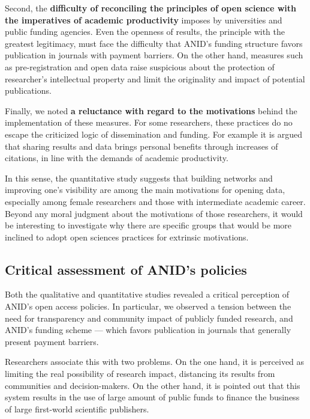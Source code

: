 \documentclass[
  english,
  letterpaper,
]{article}
\begin{document}
Second, the \textbf{difficulty of reconciling the principles of open
science with the imperatives of academic productivity} imposes by
universities and public funding agencies. Even the openness of results,
the principle with the greatest legitimacy, must face the difficulty
that ANID's funding structure favors publication in journals with
payment barriers. On the other hand, measures such as pre-registration
and open data raise suspicious about the protection of researcher's
intellectual property and limit the originality and impact of potential
publications.

Finally, we noted \textbf{a reluctance with regard to the motivations}
behind the implementation of these measures. For some researchers, these
practices do no escape the criticized logic of dissemination and
funding. For example it is argued that sharing results and data brings
personal benefits through increases of citations, in line with the
demands of academic productivity.

In this sense, the quantitative study suggests that building networks
and improving one's visibility are among the main motivations for
opening data, especially among female researchers and those with
intermediate academic career. Beyond any moral judgment about the
motivations of those researchers, it would be interesting to investigate
why there are specific groups that would be more inclined to adopt open
sciences practices for extrinsic motivations.

\subsection{Critical assessment of ANID's
policies}\label{critical-assessment-of-anids-policies}

Both the qualitative and quantitative studies revealed a critical
perception of ANID's open access policies. In particular, we observed a
tension between the need for transparency and community impact of
publicly funded research, and ANID's funding scheme --- which favors
publication in journals that generally present payment barriers.

Researchers associate this with two problems. On the one hand, it is
perceived as limiting the real possibility of research impact,
distancing its results from communities and decision-makers. On the
other hand, it is pointed out that this system results in the use of
large amount of public funds to finance the business of large
first-world scientific publishers.
\end{document}
